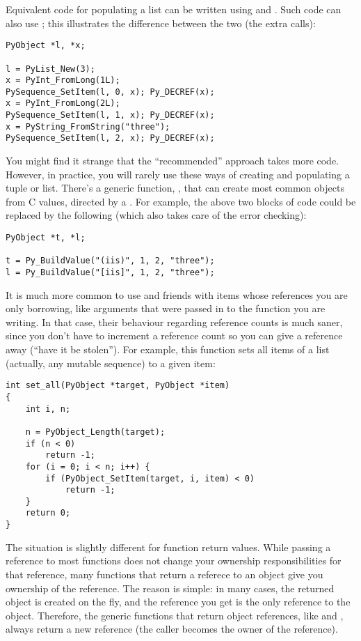 \documentclass{manual}
\begin{document}
Equivalent code for populating a list can be written using 
 and .  Such code
can also use ; this illustrates the
difference between the two (the extra  calls):

\begin{verbatim}
PyObject *l, *x;

l = PyList_New(3);
x = PyInt_FromLong(1L);
PySequence_SetItem(l, 0, x); Py_DECREF(x);
x = PyInt_FromLong(2L);
PySequence_SetItem(l, 1, x); Py_DECREF(x);
x = PyString_FromString("three");
PySequence_SetItem(l, 2, x); Py_DECREF(x);
\end{verbatim}

You might find it strange that the ``recommended'' approach takes more
code.  However, in practice, you will rarely use these ways of
creating and populating a tuple or list.  There's a generic function,
, that can create most common objects from
C values, directed by a .  For example, the
above two blocks of code could be replaced by the following (which
also takes care of the error checking):

\begin{verbatim}
PyObject *t, *l;

t = Py_BuildValue("(iis)", 1, 2, "three");
l = Py_BuildValue("[iis]", 1, 2, "three");
\end{verbatim}

It is much more common to use  and
friends with items whose references you are only borrowing, like
arguments that were passed in to the function you are writing.  In
that case, their behaviour regarding reference counts is much saner,
since you don't have to increment a reference count so you can give a
reference away (``have it be stolen'').  For example, this function
sets all items of a list (actually, any mutable sequence) to a given
item:

\begin{verbatim}
int set_all(PyObject *target, PyObject *item)
{
    int i, n;

    n = PyObject_Length(target);
    if (n < 0)
        return -1;
    for (i = 0; i < n; i++) {
        if (PyObject_SetItem(target, i, item) < 0)
            return -1;
    }
    return 0;
}
\end{verbatim}

The situation is slightly different for function return values.  
While passing a reference to most functions does not change your 
ownership responsibilities for that reference, many functions that 
return a referece to an object give you ownership of the reference.
The reason is simple: in many cases, the returned object is created 
on the fly, and the reference you get is the only reference to the 
object.  Therefore, the generic functions that return object 
references, like  and 
, always return a new reference (the
caller becomes the owner of the reference).
\end{document}
